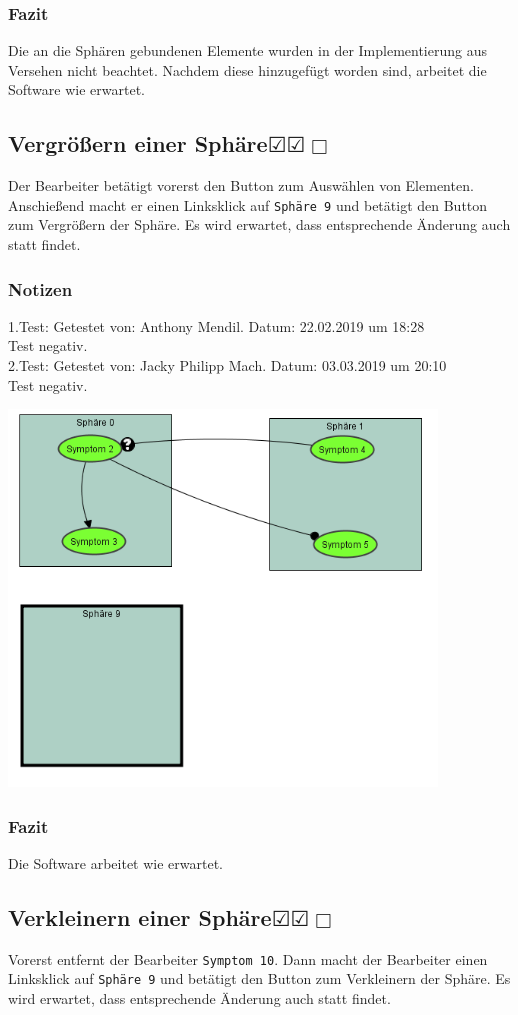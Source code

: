 \documentclass[enabledeprecatedfontcommands]{scrartcl}
\newcommand{\subsectiont}[2]{\subsection[#1]{#1{\normalsize\normalfont #2}}}
\newcommand{\leer}{$\Box$}
\newcommand{\ok}{$\CheckedBox$}
\begin{document}
\subsubsection{Fazit}
Die an die Sphären gebundenen Elemente wurden in der Implementierung aus Versehen nicht beachtet. Nachdem diese hinzugefügt worden sind, arbeitet die Software wie erwartet.

\subsectiont{Vergrößern einer Sphäre}{\dotfill\ok\ok\leer}
Der Bearbeiter betätigt vorerst den Button zum Auswählen von Elementen. Anschießend macht er einen Linksklick auf \texttt{Sphäre 9} und betätigt den Button zum Vergrößern der Sphäre. Es wird erwartet, dass entsprechende Änderung auch statt findet. 
\subsubsection{Notizen}
1.Test: Getestet von: Anthony Mendil. Datum: 22.02.2019 um 18:28 \\
Test negativ.\\
2.Test: Getestet von: Jacky Philipp Mach. Datum: 03.03.2019 um 20:10 \\
Test negativ. 
\begin{center}
\includegraphics[height=10cm]{2_12.PNG}
\end{center}
\subsubsection{Fazit}
Die Software arbeitet wie erwartet. 

\subsectiont{Verkleinern einer Sphäre}{\dotfill\ok\ok\leer}
Vorerst entfernt der Bearbeiter \texttt{Symptom 10}. Dann macht der Bearbeiter einen Linksklick auf \texttt{Sphäre 9} und betätigt den Button zum Verkleinern der Sphäre. Es wird erwartet, dass entsprechende Änderung auch statt findet. 
\end{document}
